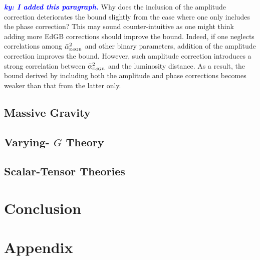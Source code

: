 \documentclass[prd,twocolumn,nofootinbib]{revtex4-1}
\newcommand{\EDGB}{{\mbox{\tiny EdGB}}}
\newcommand{\ky}[1]{\textcolor{blue}{\it{\textbf{ky: #1}}} }
\begin{document}
\ky{I added this paragraph.}
Why does the inclusion of the amplitude correction deteriorates the bound slightly from the case where one only includes the phase correction? This may sound counter-intuitive as one might think adding more EdGB corrections should improve the bound. Indeed, if one neglects correlations among $\bar \alpha^2_\EDGB$ and other binary parameters, addition of the amplitude correction improves the bound. However, such amplitude correction introduces a strong correlation between $\bar \alpha^2_\EDGB$ and the luminosity distance. As a result, the bound derived by including both the amplitude and phase corrections becomes weaker than that from the latter only.


\subsection{Massive Gravity}
\subsection{Varying- $G$ Theory}
\subsection{Scalar-Tensor Theories}
\section{Conclusion}
\section{Appendix}

\end{document}
